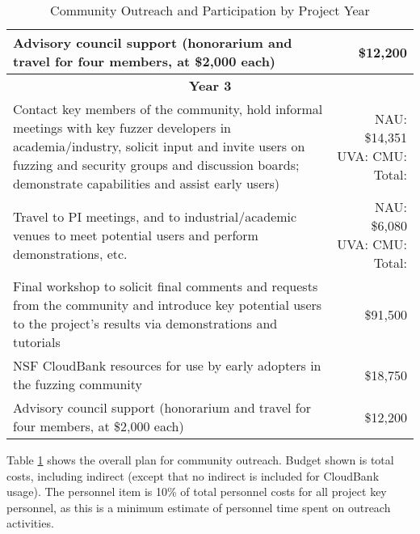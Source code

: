 \documentclass[12pt]{article}
\begin{document}
\begin{table}
\begin{tabular}{|p{12cm}|r|}
    \hline 
    Advisory council support (honorarium and travel for four members, 
    at \$2,000 each) & \$12,200 \\    
    \hline
    \hline
    \multicolumn{2}{c}{{\bf Year 3}} \\
    \hline
    \hline
   Contact key members of the community, hold informal meetings with
    key fuzzer developers in academia/industry, solicit input and
    invite users
    on fuzzing and security groups and discussion boards; demonstrate
    capabilities and assist early users) &  NAU:  \$14,351 UVA: CMU:
                                                      Total:  \\
    \hline
    Travel to PI meetings, and to industrial/academic venues to meet
    potential users and perform demonstrations, etc. & NAU: \$6,080 UVA: CMU: Total:\\
    \hline    
    Final workshop to solicit final comments and requests from the
    community and introduce key potential users to the project’s
    results via demonstrations and tutorials & \$91,500 \\
    \hline
    NSF CloudBank resources for use by early adopters in the fuzzing 
    community & \$18,750 \\
    \hline 
    Advisory council support (honorarium and travel for four members, 
    at \$2,000 each) & \$12,200 \\    
    \hline    
 
  \end{tabular}
  \caption{Community Outreach and Participation by Project Year}
  \label{tab:outreach}
  
\end{table}


Table \ref{tab:outreach} shows the overall plan for community
outreach.   Budget shown is total costs, including indirect (except
that no indirect is included for CloudBank usage).  The personnel item is 10\%
of total personnel costs for all project key personnel, as this is a
minimum estimate of personnel time spent on outreach activities.
\end{document}
